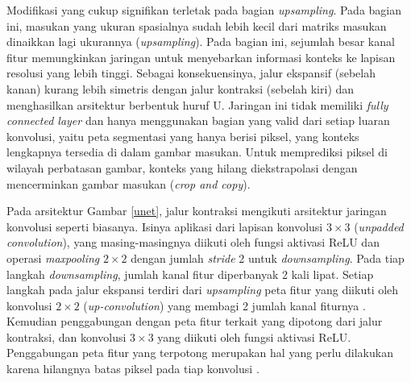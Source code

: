 Modifikasi yang cukup signifikan terletak pada bagian \emph{upsampling}. Pada bagian ini, masukan yang ukuran spasialnya sudah lebih kecil dari matriks masukan dinaikkan lagi ukurannya (\emph{upsampling}). Pada bagian ini, sejumlah besar kanal fitur memungkinkan jaringan untuk menyebarkan informasi konteks ke lapisan resolusi yang lebih tinggi. Sebagai konsekuensinya, jalur ekspansif (sebelah kanan) kurang lebih simetris dengan jalur kontraksi (sebelah kiri) dan menghasilkan arsitektur berbentuk huruf U. Jaringan ini tidak memiliki \emph{fully connected layer} dan hanya menggunakan bagian yang valid dari setiap luaran konvolusi, yaitu peta segmentasi yang hanya berisi piksel, yang konteks lengkapnya tersedia di dalam gambar masukan. Untuk memprediksi piksel di wilayah perbatasan gambar, konteks yang hilang diekstrapolasi dengan mencerminkan gambar masukan (\emph{crop and copy}).

Pada arsitektur Gambar \ref{unet}, jalur kontraksi mengikuti arsitektur jaringan konvolusi seperti biasanya. Isinya aplikasi dari lapisan konvolusi $3 \times 3$ (\emph{unpadded convolution}), yang masing-masingnya diikuti oleh fungsi aktivasi ReLU dan operasi \emph{maxpooling} $2 \times 2$ dengan jumlah \emph{stride} 2 untuk \emph{downsampling}. Pada tiap langkah \emph{downsampling}, jumlah kanal fitur diperbanyak 2 kali lipat. Setiap langkah pada jalur ekspansi terdiri dari \emph{upsampling} peta fitur yang diikuti oleh konvolusi $2 \times 2$ (\emph{up-convolution}) yang membagi 2 jumlah kanal fiturnya . Kemudian penggabungan dengan peta fitur terkait yang dipotong dari jalur kontraksi, dan konvolusi $3 \times 3$ yang diikuti oleh fungsi aktivasi ReLU. Penggabungan peta fitur yang terpotong merupakan hal yang perlu dilakukan karena hilangnya batas piksel pada tiap konvolusi \citep{DBLP:journals/corr/RonnebergerFB15}. 